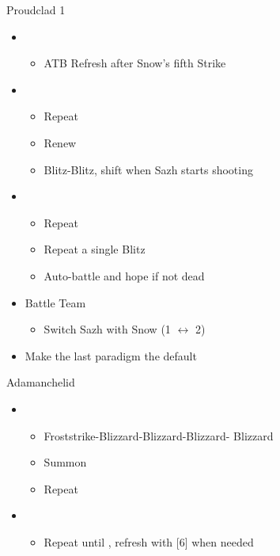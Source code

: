 \begin{multicols}{2}
\begin{battle}{Proudclad 1}
\begin{itemize}
    \item \sixth
    \begin{itemize}
        \item ATB Refresh after Snow's fifth Strike
    \end{itemize}
    \item \first
    \begin{itemize}
        \item Repeat
        \item Renew
        \item Blitz-Blitz, shift when Sazh starts shooting
    \end{itemize}
    \item \second
    \begin{itemize}
        \item Repeat
        \item Repeat a single Blitz
        \item Auto-battle and hope if not dead
    \end{itemize}
\end{itemize}
\end{battle}
\begin{menu}
\begin{itemize}
    \paradigm
    \begin{itemize}
        \item Battle Team
        \begin{itemize}
            \item Switch Sazh with Snow (1 $\leftrightarrow$ 2)
        \end{itemize}
        \item Make the last paradigm the default
    \end{itemize}
\end{itemize}
\end{menu}
\vfill
\begin{battle}{Adamanchelid}
\begin{itemize}
    \item \sixth
    \begin{itemize}
        \item Froststrike-Blizzard-Blizzard-Blizzard- Blizzard
        \item Summon
        \item Repeat
    \end{itemize}
    \item \fifth
    \begin{itemize}
        \item Repeat until \stagger, refresh with [6] when needed

\end{itemize}
\end{itemize}
\end{battle}
\end{multicols}
